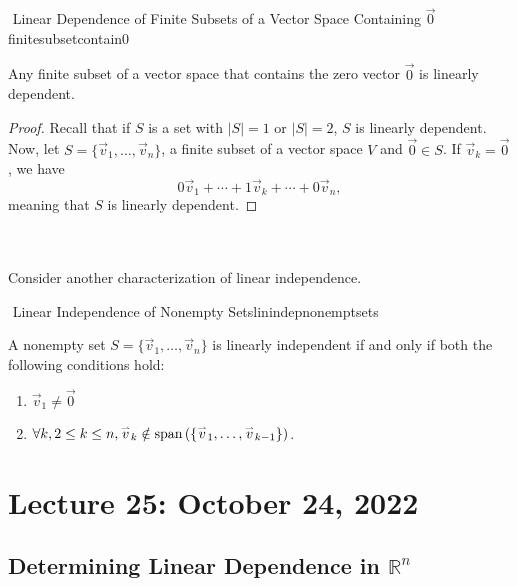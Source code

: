         \begin{theorem}{\Stop\,\,Linear Dependence of Finite Subsets of a Vector Space Containing \(\vec{0}\)}{finitesubsetcontain0}
            
            Any finite subset of a vector space that contains the zero vector \(\vec{0}\) is linearly dependent.
            \begin{proof}
                Recall that if \(S\) is a set with \(|S|=1\) or \(|S|=2\), \(S\) is linearly dependent. Now, let \(S=\{\vec{v}_1,\ldots,\vec{v}_n\}\), a finite subset of a vector space \(V\) and \(\vec{0}\in S\). If \(\vec{v}_k=\vec{0}\), we have
                \begin{equation*}
                    0\vec{v}_1+\cdots+1\vec{v}_k+\cdots+0\vec{v}_n,
                \end{equation*}
                meaning that \(S\) is linearly dependent.
            \end{proof}

        \end{theorem}
        \pagebreak
        \vphantom
        \\
        \\
        Consider another characterization of linear independence.
        \begin{theorem}{\Stop\,\,Linear Independence of Nonempty Sets}{linindepnonemptsets}
        
            A nonempty set \(S=\{\vec{v}_1,\ldots,\vec{v}_n\}\) is linearly independent if and only if both the following conditions hold:
            \begin{enumerate}
                \item \(\vec{v}_1\neq\vec{0}\)
                \item \(\forall k,2\leq k \leq n, \overset{_{\rightharpoonup}}{v}_k\notin\text{span\,}(\{\overset{_{\rightharpoonup}}{v}_1,\ldots,\overset{_{\rightharpoonup}}{v}_{k-1}\})\).
            \end{enumerate}
        
        \end{theorem}

\pagebreak

    \section{Lecture 25: October 24, 2022}

        \subsection{Determining Linear Dependence in \(\mathbb{R}^n\)}

